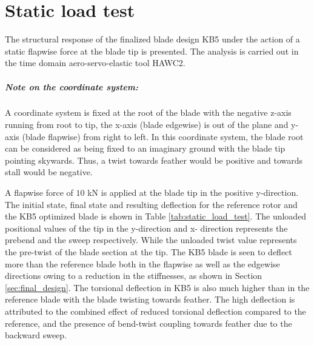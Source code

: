 \chapter{Static load test}
\label{ch:load_test}

The structural response of the finalized blade design KB5 under the action of a static flapwise force at the blade tip is presented. The analysis is carried out in the time domain aero-servo-elastic tool HAWC2. 
\paragraph{Note on the coordinate system:}
A coordinate system is fixed at the root of the blade with the negative z-axis running from root to tip, the x-axis (blade edgewise) is out of the plane and y-axis (blade flapwise) from right to left. In this coordinate system, the blade root can be considered as being fixed to an imaginary ground with the blade tip pointing skywards. Thus, a twist towards feather would be positive and towards stall would be negative.

A flapwise force of $10$ kN is applied at the blade tip in the positive y-direction. The initial state, final state and resulting deflection for the reference rotor and the KB5 optimized blade is shown in Table \ref{tab:static_load_test}. The unloaded positional values of the tip in the y-direction and x- direction represents the prebend and the sweep respectively. While the unloaded twist value represents the pre-twist of the blade section at the tip. The KB5 blade is seen to deflect more than the reference blade both in the flapwise as well as the edgewise directions owing to a reduction in the stiffnesses, as shown in Section \ref{sec:final_design}. The torsional deflection in KB5 is also much higher than in the reference blade with the blade twisting towards feather. The high deflection is attributed to the combined effect of reduced torsional deflection compared to the reference, and the presence of bend-twist coupling towards feather due to the backward sweep.

